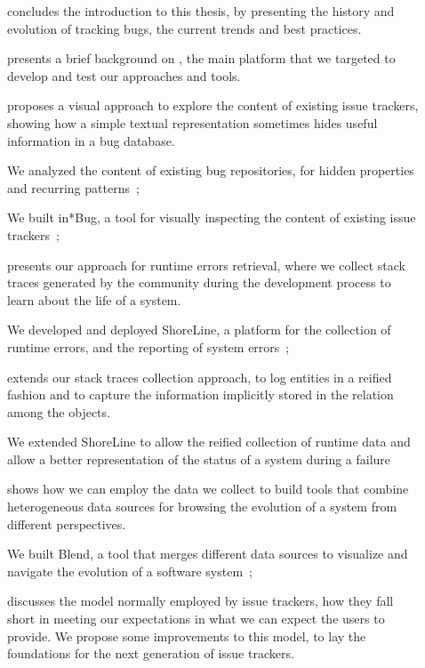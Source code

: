 \begin{description}
  \item[] concludes the introduction to this thesis, by presenting the history and evolution of tracking bugs, the current trends and best practices.

  \item[] presents a brief background on \pha, the main platform that we targeted to develop and test our approaches and tools.

  \item[] proposes a visual approach to explore the content of existing issue trackers, showing how a simple textual representation sometimes hides useful information in a bug database.

  We analyzed the content of existing bug repositories, for hidden properties and recurring patterns~\cite{DalS2013a,DalS2016a};

  We built in*Bug, a tool for visually inspecting the content of existing issue trackers~\cite{DalS2013a,DalS2014a};


  \item[] presents our approach for runtime errors retrieval, where we collect stack traces generated by the community during the development process to learn about the life of a system.

  We developed and deployed ShoreLine, a platform for the collection of runtime errors, and the reporting of system errors~\cite{DalS2015a};


  \item[] extends our stack traces collection approach, to log entities in a reified fashion and to capture the information implicitly stored in the relation among the objects.

  We extended ShoreLine to allow the reified collection of runtime data and allow a better representation of the status of a system during a failure~\cite{DalS2017b}


  \item[] shows how we can employ the data we collect to build tools that combine heterogeneous data sources for browsing the evolution of a system from different perspectives.

  We built Blend, a tool that merges different data sources to visualize and navigate the evolution of a software system~\cite{DalS2015b};

  \item[] discusses the model normally employed by issue trackers, how they fall short in meeting our expectations in what we can expect the users to provide. We propose some improvements to this model, to lay the foundations for the next generation of issue trackers.


\end{description}

